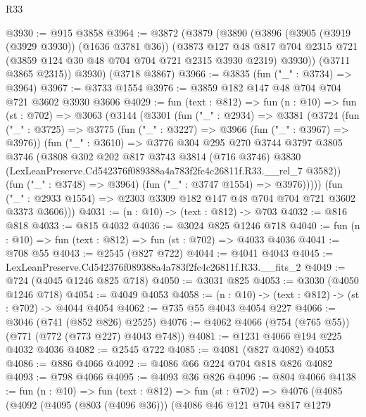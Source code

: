 \begin{lexlean}{R33}
\begin{coremodule}
@3930 := @915 @3858
@3964 := @3872
    (@3879
      (@3890
        (@3896
          (@3905 (@3919 (@3929 @3930)) (@1636 @3781 @36))
          (@3873
            @127
            @48
            @817
            @704
            @2315
            @721
            (@3859 @124 @30 @48 @704 @704 @721 @2315 @3930 @2319)
            @3930))
        (@3711 @3865 @2315))
      @3930)
    (@3718 @3867)
@3966 := @3835 (fun ("_" : @3734) => @3964)
@3967 := @3733 @1554
@3976 := @3859 @182 @147 @48 @704 @704 @721 @3602 @3930 @3606
@4029 := fun (text : @812) =>
  fun (n : @10) =>
  fun (st : @702) =>
  @3063
    (@3144
      (@3301
        (fun ("_" : @2934) =>
        @3381
          (@3724
            (fun ("_" : @3725) =>
            @3775
              (fun ("_" : @3227) => @3966 (fun ("_" : @3967) => @3976))
              (fun ("_" : @3610) =>
              @3776
                @304
                @295
                @270
                @3744
                @3797
                @3805
                @3746
                (@3808
                  @302
                  @202
                  @817
                  @3743
                  @3814
                  (@716 @3746)
                  @3830
                  (LexLeanPreserve.Cd542376f089388a4a783f2fc4c26811f.R33.__rel_7 @3582))
                (fun ("_" : @3748) => @3964)
                (fun ("_" : @3747 @1554) => @3976)))))
        (fun ("_" : @2933 @1554) => @2303 @3309 @182 @147 @48 @704 @704 @721 @3602 @3373 @3606)))
@4031 := (n : @10) -> (text : @812) -> @703
@4032 := @816 @818
@4033 := @815 @4032
@4036 := @3024 @825 @1246 @718
@4040 := fun (n : @10) => fun (text : @812) => fun (st : @702) => @4033 @4036
@4041 := @708 @55
@4043 := @2545 (@827 @722)
@4044 := @4041 @4043
@4045 := LexLeanPreserve.Cd542376f089388a4a783f2fc4c26811f.R33.__fits_2
@4049 := @724 (@4045 @1246 @825 @718)
@4050 := @3031 @825
@4053 := @3030 (@4050 @1246 @718)
@4054 := @4049 @4053
@4058 := (n : @10) -> (text : @812) -> (st : @702) -> @4044 @4054
@4062 := @735 @55 @4043 @4054 @227
@4066 := @3046 (@741 (@852 @826) @2525)
@4076 := @4062 @4066 (@754 (@765 @55)) (@771 (@772 (@773 @227) @4043 @748))
@4081 := @1231 @4066 @194 @225 @4032 @4036
@4082 := @2545 @722
@4085 := @4081 (@827 @4082) @4053
@4086 := @886 @4066
@4092 := @4086 @66 @224 @704 @818 @826 @4082
@4093 := @798 @4066
@4095 := @4093 @36 @826
@4096 := @804 @4066
@4138 := fun (n : @10) =>
  fun (text : @812) =>
  fun (st : @702) =>
  @4076
    (@4085
      (@4092
        (@4095 (@803 (@4096 @36)))
        (@4086
          @46
          @121
          @704
          @817
          @1279

\end{coremodule}
\end{lexlean}
